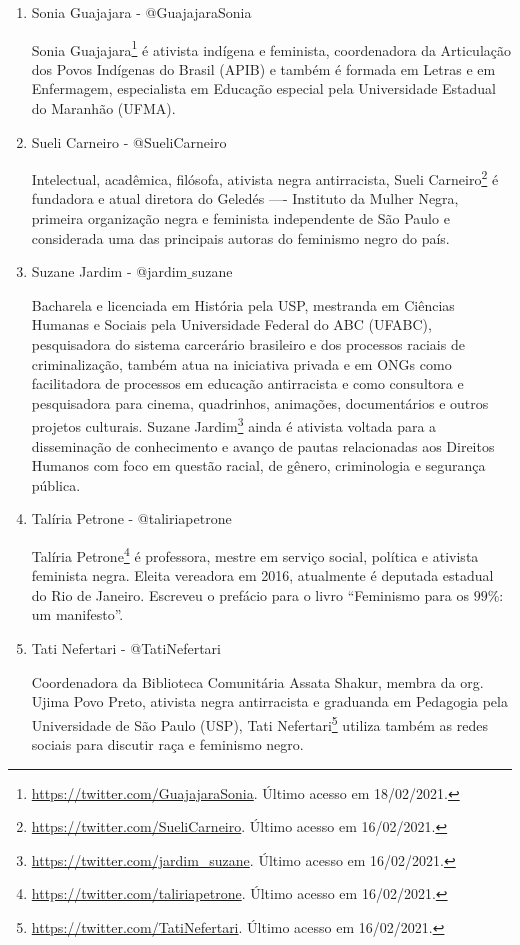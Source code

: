 \documentclass[
	12pt,				%
	openright,			%
	twoside,			%
	a4paper,			%
	english,			%
	brazil				%
	]{abntex2}
\begin{document}
\begin{anexosenv}
\begin{enumerate}
 \item Sonia Guajajara - @GuajajaraSonia
 
 Sonia Guajajara\footnote{\url{https://twitter.com/GuajajaraSonia}. Último acesso em 18/02/2021.} é ativista indígena e feminista, coordenadora da Articulação dos Povos Indígenas do Brasil (APIB) e também é formada em Letras e em Enfermagem, especialista em Educação especial pela Universidade Estadual do Maranhão (UFMA).

 \item Sueli Carneiro - @SueliCarneiro
 
 Intelectual, acadêmica, filósofa, ativista negra antirracista, Sueli Carneiro\footnote{\url{https://twitter.com/SueliCarneiro}. Último acesso em 16/02/2021.} é fundadora e atual diretora do Geledés —- Instituto da Mulher Negra, primeira organização negra e feminista independente de São Paulo e considerada uma das principais autoras do feminismo negro do país.

 \item Suzane Jardim - @jardim$\_$suzane
 
 Bacharela e licenciada em História pela USP, mestranda em Ciências Humanas e Sociais pela Universidade Federal do ABC (UFABC), pesquisadora do sistema carcerário brasileiro e dos processos raciais de criminalização, também atua na iniciativa privada e em ONGs como facilitadora de processos em educação antirracista e como consultora e pesquisadora para cinema, quadrinhos, animações, documentários e outros projetos culturais. Suzane Jardim\footnote{\url{https://twitter.com/jardim_suzane}. Último acesso em 16/02/2021.} ainda é ativista voltada para a disseminação de conhecimento e avanço de pautas relacionadas aos Direitos Humanos com foco em questão racial, de gênero, criminologia e segurança pública.

 \item Talíria Petrone - @taliriapetrone
 
 Talíria Petrone\footnote{\url{https://twitter.com/taliriapetrone}. Último acesso em 16/02/2021.} é professora, mestre em serviço social, política e ativista feminista negra. Eleita vereadora em 2016, atualmente é deputada estadual do Rio de Janeiro. Escreveu o prefácio para o livro ``Feminismo para os $99\%$: um manifesto''.

 \item Tati Nefertari - @TatiNefertari
 
 Coordenadora da Biblioteca Comunitária Assata Shakur, membra da org. Ujima Povo Preto, ativista negra antirracista e graduanda em Pedagogia pela Universidade de São Paulo (USP), Tati Nefertari\footnote{\url{https://twitter.com/TatiNefertari}. Último acesso em 16/02/2021.} utiliza também as redes sociais para discutir raça e feminismo negro.


\end{enumerate}
\end{anexosenv}
\end{document}
